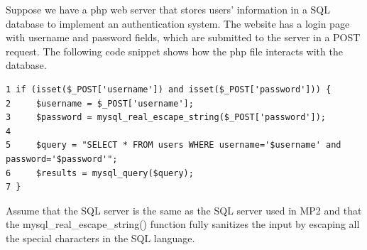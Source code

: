 \documentclass[addpoints,answers]{exam}
\begin{document}
\begin{questions}

\newpage


Suppose we have a php web server that stores users' information in a
SQL database to implement an authentication system.  The website has a
login page with username and password fields, which are submitted to
the server in a POST request.  The following code snippet shows how
the php file interacts with the database.

\begin{lstlisting}
1 if (isset($_POST['username']) and isset($_POST['password'])) { 
2     $username = $_POST['username'];
3     $password = mysql_real_escape_string($_POST['password']);
4
5     $query = "SELECT * FROM users WHERE username='$username' and password='$password'";
6     $results = mysql_query($query);
7 }
\end{lstlisting}

Assume that the SQL server is the same as the SQL server used in MP2
and that the mysql\_real\_escape\_string() function fully sanitizes
the input by escaping all the special characters in the SQL language.

\end{questions}
\end{document}
